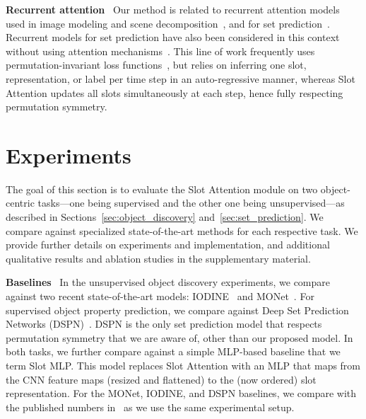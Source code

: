 \documentclass{article}
\begin{document}
\textbf{Recurrent attention} \
Our method is related to recurrent attention models used in image modeling and scene decomposition~\citep{mnih2014recurrent,gregor2015draw,eslami2016attend,ren2017end,kosiorek2018sequential}, and for set prediction~\citep{welleck2017saliency}. Recurrent models for set prediction have also been considered in this context without using attention mechanisms~\citep{stewart2016end,romera2016recurrent}. This line of work frequently uses permutation-invariant loss functions~\citep{stewart2016end,welleck2017saliency,welleck2018loss}, but relies on inferring one slot, representation, or label per time step in an auto-regressive manner, whereas Slot Attention updates all slots simultaneously at each step, hence fully respecting permutation symmetry.

\section{Experiments}\label{sec:experiments}
The goal of this section is to evaluate the Slot Attention module on two object-centric tasks---one being supervised and the other one being unsupervised---as described in Sections~\ref{sec:object_discovery} and~\ref{sec:set_prediction}. We compare against specialized state-of-the-art methods \citep{zhang2019deep,greff2019multi,burgess2019monet} for each respective task. We provide further details on experiments and implementation, and additional qualitative results and ablation studies in the supplementary material.

\textbf{Baselines} \
In the unsupervised object discovery experiments, we compare against two recent state-of-the-art models: IODINE~\citep{greff2019multi} and MONet~\citep{burgess2019monet}.
For supervised object property prediction, we compare against Deep Set Prediction Networks (DSPN)~\citep{zhang2019deep}. DSPN is the only set prediction model that respects permutation symmetry that we are aware of, other than our proposed model.
In both tasks, we further compare against a simple MLP-based baseline that we term Slot MLP. This model replaces Slot Attention with an MLP that maps from the CNN feature maps (resized and flattened) to the (now ordered) slot representation. For the MONet, IODINE, and DSPN baselines, we compare with the published numbers in~\citep{greff2019multi,zhang2019deep} as we use the same experimental setup.
\end{document}
